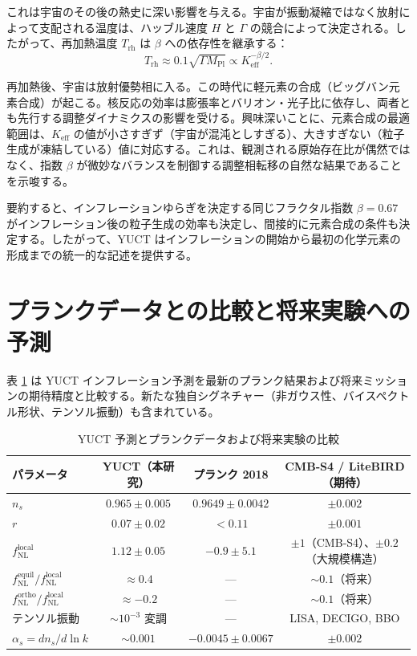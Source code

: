 \documentclass[11pt,a4paper]{article}
\theoremstyle{remark}
\newcommand{\Keff}{K_{\mathrm{eff}}}
\newcommand{\rs}{r}
\begin{document}
	これは宇宙のその後の熱史に深い影響を与える。宇宙が振動凝縮ではなく放射によって支配される温度は、ハッブル速度 $H$ と $\Gamma$ の競合によって決定される。したがって、再加熱温度 $T_{\mathrm{rh}}$ は $\beta$ への依存性を継承する：
	\begin{equation}
		T_{\mathrm{rh}} \approx 0.1 \sqrt{\Gamma M_{\mathrm{Pl}}} \propto \Keff^{-\beta/2}.
		\label{eq:trh}
	\end{equation}
	
	再加熱後、宇宙は放射優勢相に入る。この時代に軽元素の合成（ビッグバン元素合成）が起こる。核反応の効率は膨張率とバリオン・光子比に依存し、両者とも先行する調整ダイナミクスの影響を受ける。興味深いことに、元素合成の最適範囲は、$\Keff$ の値が小さすぎず（宇宙が混沌としすぎる）、大きすぎない（粒子生成が凍結している）値に対応する。これは、観測される原始存在比が偶然ではなく、指数 $\beta$ が微妙なバランスを制御する調整相転移の自然な結果であることを示唆する。
	
	要約すると、インフレーションゆらぎを決定する同じフラクタル指数 $\beta = 0.67$ がインフレーション後の粒子生成の効率も決定し、間接的に元素合成の条件も決定する。したがって、YUCT はインフレーションの開始から最初の化学元素の形成までの統一的な記述を提供する。
	
	\section{プランクデータとの比較と将来実験への予測}
	\label{sec:comparison}
	
	表 \ref{tab:comparison} は YUCT インフレーション予測を最新のプランク結果および将来ミッションの期待精度と比較する。新たな独自シグネチャー（非ガウス性、バイスペクトル形状、テンソル振動）も含まれている。
	
	\begin{table}[htbp]
		\centering
		\caption{YUCT 予測とプランクデータおよび将来実験の比較}
		\label{tab:comparison}
		\begin{tabular}{lccc}
			\toprule
			\textbf{パラメータ} & \textbf{YUCT（本研究）} & \textbf{プランク 2018} & \textbf{CMB‑S4 / LiteBIRD（期待）} \\
			\midrule
			$n_s$ & $0.965 \pm 0.005$ & $0.9649 \pm 0.0042$ & $\pm 0.002$ \\
			$\rs$ & $0.07 \pm 0.02$ & $<0.11$ & $\pm 0.001$ \\
			$f_{\mathrm{NL}}^{\mathrm{local}}$ & $1.12 \pm 0.05$ & $-0.9 \pm 5.1$ & $\pm 1$（CMB‑S4）、$\pm 0.2$（大規模構造） \\
			$f_{\mathrm{NL}}^{\mathrm{equil}} / f_{\mathrm{NL}}^{\mathrm{local}}$ & $\approx 0.4$ & — & $\sim 0.1$（将来） \\
			$f_{\mathrm{NL}}^{\mathrm{ortho}} / f_{\mathrm{NL}}^{\mathrm{local}}$ & $\approx -0.2$ & — & $\sim 0.1$（将来） \\
			テンソル振動 & $\sim 10^{-3}$ 変調 & — & LISA, DECIGO, BBO \\
			$\alpha_s = dn_s/d\ln k$ & $\sim 0.001$ & $-0.0045 \pm 0.0067$ & $\pm 0.002$ \\
			\bottomrule
		\end{tabular}
	\end{table}
	
\end{document}
